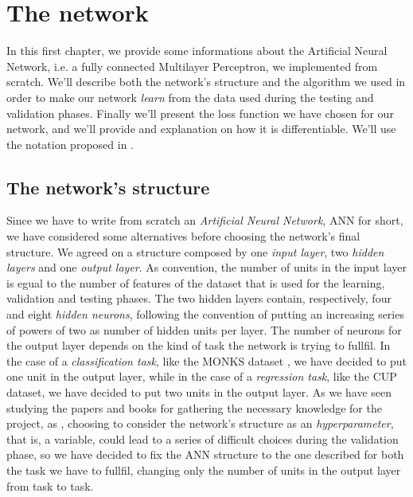 \chapter{The network} %
\label{cha:the_network}
	In this first chapter, we provide some informations about the Artificial Neural Network, i.e. a fully
	connected Multilayer Perceptron, we implemented from scratch. We'll describe both the network's structure and
	the algorithm we used in order to make our network \textit{learn} from the data used during the testing and
	validation phases. Finally we'll present the loss function we have chosen for our network, and we'll provide
	and explanation on how it is differentiable. We'll use the notation proposed in \cite{Goodfellow-et-al-2016}.

	\section{The network's structure} %
	\label{sec:the_network_s_structure}
		Since we have to write from scratch an \textit{Artificial Neural Network}, ANN for short, we have
		considered some alternatives before choosing the network's final structure. We agreed on a structure
		composed by one \textit{input layer}, two \textit{hidden layers} and one \textit{output layer}. As
		convention, the number of units in the input layer is egual to the number
		of features of the dataset that is used for the learning, validation and testing phases. The two
		hidden layers contain, respectively, four and eight \textit{hidden neurons}, following the convention of
		putting an increasing series of powers of two as number of hidden units per layer. The number of neurons
		for the output layer depends on the kind of task the network is trying to fullfil. In the case of a
		\textit{classification task}, like the MONKS dataset \cite{Dua:2019}, we have decided to put one unit in
		the output layer, while in the case of a \textit{regression task}, like the CUP dataset, we have decided to
		put two units in the output layer. As we have seen studying the papers and books for gathering the
		necessary knowledge for the project, as \cite{Goodfellow-et-al-2016,haykin2009neural,mitchell1997machine},
		choosing to consider the network's structure as an \textit{hyperparameter}, that is, a variable, could
		lead to a series of difficult choices during the validation phase, so we have decided to fix the ANN
		structure to the one described for both the task we have to fullfil, changing only the number of units in
		the output layer from task to task.


